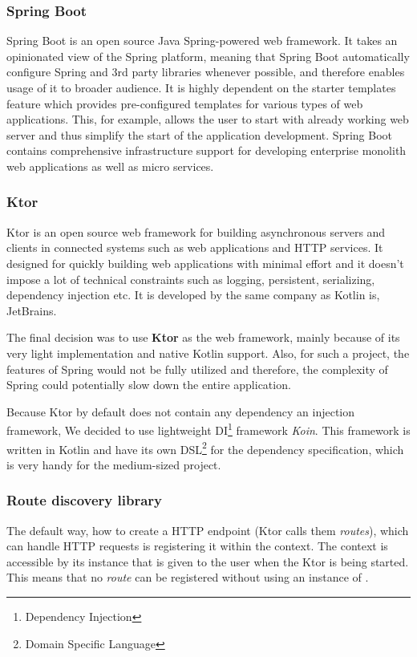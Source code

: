 \subsubsection{Spring Boot}
Spring Boot\cite{springBootReference} is an open source Java Spring-powered web framework.
It takes an opinionated view of the Spring platform,
meaning that Spring Boot automatically configure Spring and 3rd party libraries whenever possible,
and therefore enables usage of it to broader audience.
It is highly dependent on the starter templates feature which provides pre-configured templates for various types of web applications.
This, for example, allows the user to start with already working web server
and thus simplify the start of the application development\cite{springBootGithubReference}.
Spring Boot contains comprehensive infrastructure support for developing enterprise monolith web applications as well as micro services\cite{springBootGithubReference}.

\subsubsection{Ktor}\label{subsubsec:ktor}
Ktor \cite{ktorWebPage} is an open source web framework for building asynchronous servers 
and clients in connected systems such as web applications and HTTP services.
It designed for quickly building web applications with minimal effort 
and it doesn't impose a lot of technical constraints such as logging, persistent, serializing, dependency injection etc.\cite{ktorApiReference}
It is developed by the same company as Kotlin is, JetBrains.


\bigskip
The final decision was to use \textbf{Ktor} as the web framework,
mainly because of its very light implementation and native Kotlin support.
Also, for such a project, 
the features of Spring would not be fully utilized
and therefore, the complexity of Spring could potentially slow down the entire application.

Because Ktor by default does not contain any dependency an injection framework, 
We decided to use lightweight DI\footnote{Dependency Injection} framework \textit{Koin}\cite{koinGithub}.
This framework is written in Kotlin and have its own DSL\footnote{Domain Specific Language} for the dependency specification,
which is very handy for the medium-sized project.

\subsubsection{Route discovery library}
The default way, how to create a HTTP endpoint (Ktor calls them \textit{routes}),
which can handle HTTP requests is registering it within the  context.
The  context is accessible by its instance that is given to the user when the Ktor is being started.
This means that no \textit{route} can be registered without using an instance of .


